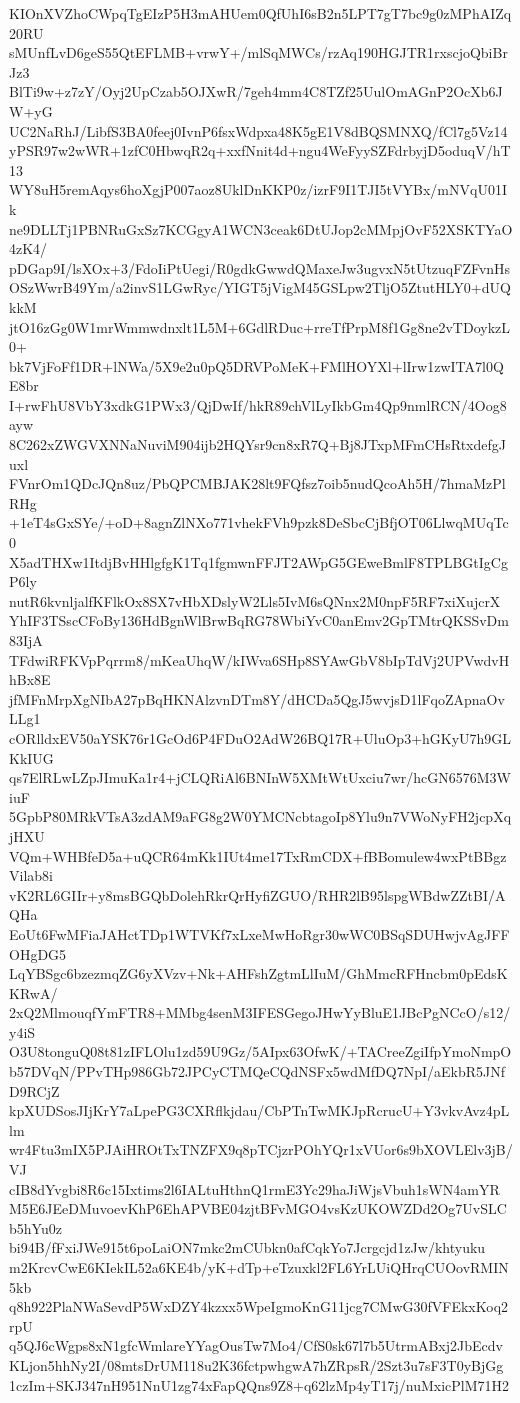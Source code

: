 KIOnXVZhoCWpqTgEIzP5H3mAHUem0QfUhI6sB2n5LPT7gT7bc9g0zMPhAIZq20RU
sMUnfLvD6geS55QtEFLMB+vrwY+/mlSqMWCs/rzAq190HGJTR1rxscjoQbiBrJz3
BlTi9w+z7zY/Oyj2UpCzab5OJXwR/7geh4mm4C8TZf25UulOmAGnP2OcXb6JW+yG
UC2NaRhJ/LibfS3BA0feej0IvnP6fsxWdpxa48K5gE1V8dBQSMNXQ/fCl7g5Vz14
yPSR97w2wWR+1zfC0HbwqR2q+xxfNnit4d+ngu4WeFyySZFdrbyjD5oduqV/hT13
WY8uH5remAqys6hoXgjP007aoz8UklDnKKP0z/izrF9I1TJI5tVYBx/mNVqU01Ik
ne9DLLTj1PBNRuGxSz7KCGgyA1WCN3ceak6DtUJop2cMMpjOvF52XSKTYaO4zK4/
pDGap9I/lsXOx+3/FdoIiPtUegi/R0gdkGwwdQMaxeJw3ugvxN5tUtzuqFZFvnHs
OSzWwrB49Ym/a2invS1LGwRyc/YIGT5jVigM45GSLpw2TljO5ZtutHLY0+dUQkkM
jtO16zGg0W1mrWmmwdnxlt1L5M+6GdlRDuc+rreTfPrpM8f1Gg8ne2vTDoykzL0+
bk7VjFoFf1DR+lNWa/5X9e2u0pQ5DRVPoMeK+FMlHOYXl+lIrw1zwITA7l0QE8br
I+rwFhU8VbY3xdkG1PWx3/QjDwIf/hkR89chVlLyIkbGm4Qp9nmlRCN/4Oog8ayw
8C262xZWGVXNNaNuviM904ijb2HQYsr9cn8xR7Q+Bj8JTxpMFmCHsRtxdefgJuxl
FVnrOm1QDcJQn8uz/PbQPCMBJAK28lt9FQfsz7oib5nudQcoAh5H/7hmaMzPlRHg
+1eT4sGxSYe/+oD+8agnZlNXo771vhekFVh9pzk8DeSbcCjBfjOT06LlwqMUqTc0
X5adTHXw1ItdjBvHHlgfgK1Tq1fgmwnFFJT2AWpG5GEweBmlF8TPLBGtIgCgP6ly
nutR6kvnljalfKFlkOx8SX7vHbXDslyW2Lls5IvM6sQNnx2M0npF5RF7xiXujcrX
YhIF3TSscCFoBy136HdBgnWlBrwBqRG78WbiYvC0anEmv2GpTMtrQKSSvDm83IjA
TFdwiRFKVpPqrrm8/mKeaUhqW/kIWva6SHp8SYAwGbV8bIpTdVj2UPVwdvHhBx8E
jfMFnMrpXgNIbA27pBqHKNAlzvnDTm8Y/dHCDa5QgJ5wvjsD1lFqoZApnaOvLLg1
cORlldxEV50aYSK76r1GcOd6P4FDuO2AdW26BQ17R+UluOp3+hGKyU7h9GLKkIUG
qs7ElRLwLZpJImuKa1r4+jCLQRiAl6BNInW5XMtWtUxciu7wr/hcGN6576M3WiuF
5GpbP80MRkVTsA3zdAM9aFG8g2W0YMCNcbtagoIp8Ylu9n7VWoNyFH2jcpXqjHXU
VQm+WHBfeD5a+uQCR64mKk1IUt4me17TxRmCDX+fBBomulew4wxPtBBgzVilab8i
vK2RL6GIIr+y8msBGQbDolehRkrQrHyfiZGUO/RHR2lB95lspgWBdwZZtBI/AQHa
EoUt6FwMFiaJAHctTDp1WTVKf7xLxeMwHoRgr30wWC0BSqSDUHwjvAgJFFOHgDG5
LqYBSgc6bzezmqZG6yXVzv+Nk+AHFshZgtmLlIuM/GhMmcRFHncbm0pEdsKKRwA/
2xQ2MlmouqfYmFTR8+MMbg4senM3IFESGegoJHwYyBluE1JBcPgNCcO/s12/y4iS
O3U8tonguQ08t81zIFLOlu1zd59U9Gz/5AIpx63OfwK/+TACreeZgiIfpYmoNmpO
b57DVqN/PPvTHp986Gb72JPCyCTMQeCQdNSFx5wdMfDQ7NpI/aEkbR5JNfD9RCjZ
kpXUDSosJIjKrY7aLpePG3CXRflkjdau/CbPTnTwMKJpRcrucU+Y3vkvAvz4pLlm
wr4Ftu3mIX5PJAiHROtTxTNZFX9q8pTCjzrPOhYQr1xVUor6s9bXOVLElv3jB/VJ
cIB8dYvgbi8R6c15Ixtims2l6IALtuHthnQ1rmE3Yc29haJiWjsVbuh1sWN4amYR
M5E6JEeDMuvoevKhP6EhAPVBE04zjtBFvMGO4vsKzUKOWZDd2Og7UvSLCb5hYu0z
bi94B/fFxiJWe915t6poLaiON7mkc2mCUbkn0afCqkYo7Jcrgcjd1zJw/khtyuku
m2KrcvCwE6KIekIL52a6KE4b/yK+dTp+eTzuxkl2FL6YrLUiQHrqCUOovRMIN5kb
q8h922PlaNWaSevdP5WxDZY4kzxx5WpeIgmoKnG11jcg7CMwG30fVFEkxKoq2rpU
q5QJ6cWgps8xN1gfcWmlareYYagOusTw7Mo4/CfS0sk67l7b5UtrmABxj2JbEcdv
KLjon5hhNy2I/08mtsDrUM118u2K36fctpwhgwA7hZRpsR/2Szt3u7sF3T0yBjGg
1czIm+SKJ347nH951NnU1zg74xFapQQns9Z8+q62lzMp4yT17j/nuMxicPlM71H2
